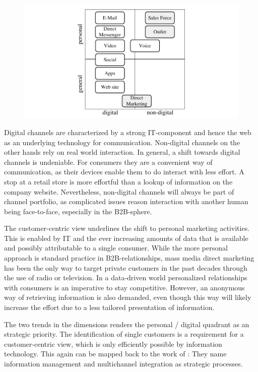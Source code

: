 			\begin{figure}[caption={Channel matrix}, label={fig:channelmatrix}]
			{	\includegraphics[width=.8\textwidth]{figures/channelmatrix.pdf}}
		\end{figure}
		
		Digital channels are characterized by a strong IT-component and hence the web as an underlying technology for communication. Non-digital channels on the other hands rely on real world interaction. In general, a shift towards digital channels is undeniable. For consumers they are a convenient way of communication, as their devices enable them to do interact with less effort. A stop at a retail store is more effortful than a lookup of information on the company website. Nevertheless, non-digital channels will always be part of channel portfolio, as complicated issues reason interaction with another human being face-to-face, especially in the B2B-sphere. 
		
		The customer-centric view underlines the shift to personal marketing activities. This is enabled by IT and the ever increasing amounts of data that is available and possibly attributable to a single consumer. While the more personal approach is standard practice in B2B-relationships, mass media direct marketing has been the only way to target private customers in the past decades through the use of radio or television. In a data-driven world personalized relationships with consumers is an imperative to stay competitive. However, an anonymous way of retrieving information is also demanded, even though this way will likely increase the effort due to a less tailored presentation of information. 
		
		The two trends in the dimensions renders the personal / digital quadrant as an strategic priority.
		The identification of single customers is a requirement for a customer-centric view, which is only efficiently possible by information technology.  
		This again can be mapped back to the work of \citeauthor{paynefrow2005}: They name information management and multichannel integration as strategic processes. 
		
